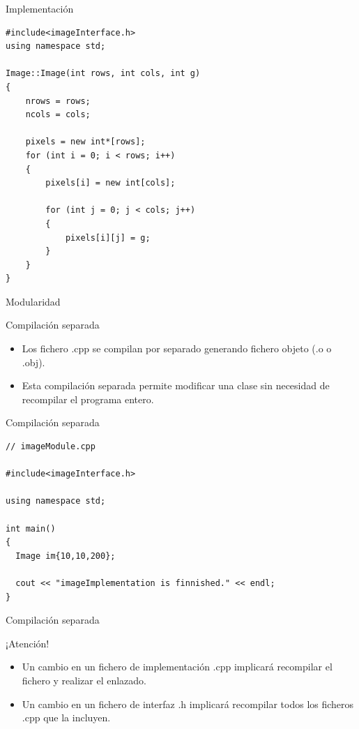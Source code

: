 \documentclass[aspectratio=169,presentation]{beamer}
\begin{document}
\begin{frame}[label={sec:org6bd25ae},fragile]{Implementación}
 \begin{verbatim}
#include<imageInterface.h>
using namespace std;
	
Image::Image(int rows, int cols, int g)
{
	nrows = rows;
	ncols = cols;
	
	pixels = new int*[rows];
	for (int i = 0; i < rows; i++)
	{
		pixels[i] = new int[cols];

		for (int j = 0; j < cols; j++)
		{
			pixels[i][j] = g;
		}
	}
}
\end{verbatim}
\end{frame}
\begin{frame}[label={sec:orgac5be71}]{Modularidad}
\begin{block}{Compilación separada}
\begin{itemize}
\item Los fichero .cpp se compilan por separado generando fichero objeto
(.o o .obj).
\item Esta compilación separada permite modificar una clase sin necesidad
de recompilar el programa entero.
\end{itemize}
\end{block}
\end{frame}
\begin{frame}[label={sec:org5dbb545},fragile]{Compilación separada}
 \begin{verbatim}
// imageModule.cpp

#include<imageInterface.h>

using namespace std;

int main()
{
  Image im{10,10,200};
    
  cout << "imageImplementation is finnished." << endl;
}
\end{verbatim}
\end{frame}
\begin{frame}[label={sec:org603e67e}]{Compilación separada}
\begin{alertblock}{¡Atención!}
\begin{itemize}
\item Un cambio en un fichero de implementación .cpp implicará recompilar
el fichero y realizar el enlazado.
\item Un cambio en un fichero de interfaz .h implicará recompilar todos
los ficheros .cpp que la incluyen.
\end{itemize}
\end{alertblock}
\end{frame}
\end{document}
